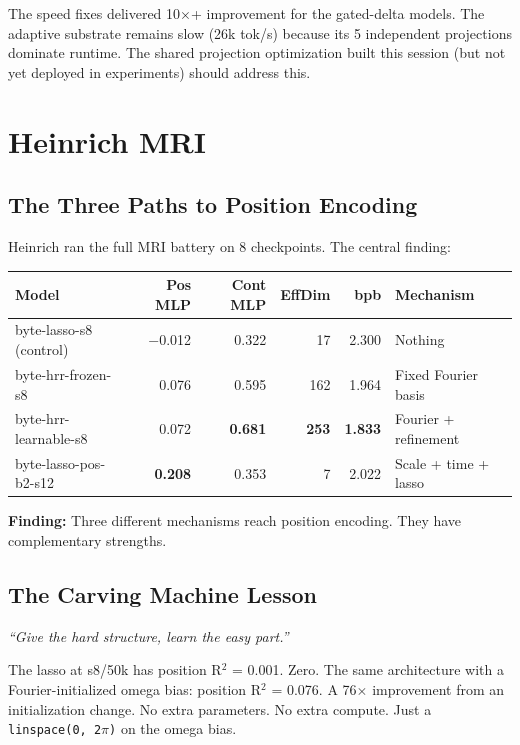 \documentclass[11pt,a4paper]{report}
\newcommand{\cq}[1]{\textcolor{q}{\textit{``#1''}}}
\newcommand{\finding}[1]{\textcolor{finding}{\textbf{Finding:}} #1}
\begin{document}
The speed fixes delivered 10$\times$+ improvement for the gated-delta models. The adaptive substrate remains slow (26k tok/s) because its 5 independent projections dominate runtime. The shared projection optimization built this session (but not yet deployed in experiments) should address this.


\chapter{Heinrich MRI}

\section{The Three Paths to Position Encoding}

Heinrich ran the full MRI battery on 8 checkpoints. The central finding:

\begin{center}
\begin{tabular}{lrrrrl}
\toprule
Model & Pos MLP & Cont MLP & EffDim & bpb & Mechanism \\
\midrule
byte-lasso-s8 (control) & $-$0.012 & 0.322 & 17 & 2.300 & Nothing \\
byte-hrr-frozen-s8 & 0.076 & 0.595 & 162 & 1.964 & Fixed Fourier basis \\
byte-hrr-learnable-s8 & 0.072 & \textbf{0.681} & \textbf{253} & \textbf{1.833} & Fourier + refinement \\
byte-lasso-pos-b2-s12 & \textbf{0.208} & 0.353 & 7 & 2.022 & Scale + time + lasso \\
\bottomrule
\end{tabular}
\end{center}

\finding{Three different mechanisms reach position encoding. They have complementary strengths.}

\section{The Carving Machine Lesson}

\cq{Give the hard structure, learn the easy part.}

The lasso at s8/50k has position R$^2$ = 0.001. Zero. The same architecture with a Fourier-initialized omega bias: position R$^2$ = 0.076. A 76$\times$ improvement from an initialization change. No extra parameters. No extra compute. Just a \texttt{linspace(0, 2$\pi$)} on the omega bias.
\end{document}
